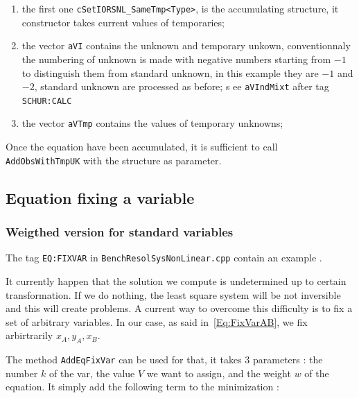 \begin{enumerate}
   \item the first one {\tt cSetIORSNL\_SameTmp<Type>}, is the accumulating structure, it
	   constructor takes current values of temporaries;

   \item  the vector {\tt aVI} contains the  unknown and temporary unkown,  
	   conventionnaly the numbering of unknown is made with negative numbers starting from
           $-1$ to distinguish them from standard unknown, in this example they are $-1$ and $-2$,
           standard unknown are processed as before; 
         s  ee {\tt aVIndMixt} after tag {\tt SCHUR:CALC}

   \item  the vector {\tt aVTmp} contains the  values of temporary unknowns;
\end{enumerate}

Once the equation have been accumulated, it is sufficient to call {\tt AddObsWithTmpUK}
with the structure as parameter.


\subsection{Equation fixing a variable}

\subsubsection{Weigthed version for standard variables}

\label{WeightedFixVar}
The tag  {\tt  EQ:FIXVAR} in {\tt BenchResolSysNonLinear.cpp} contain an example .

It currently happen that the solution we compute is undetermined
up to  certain transformation.  If we do nothing, the least square
system will be not inversible and this will create problems.
A current way  to overcome this difficulty is to fix a set
of arbitrary variables.  In our case, as said in~\ref{Eq:FixVarAB}, 
we fix arbirtrarily $x_A,y_A,x_B$.  

The method {\tt AddEqFixVar} can be used for that, it takes $3$ parameters :
the number $k$ of the var, the value $V$ we want to assign, and the weight $w$
of the equation.  It simply add the following term  to the minimization :

